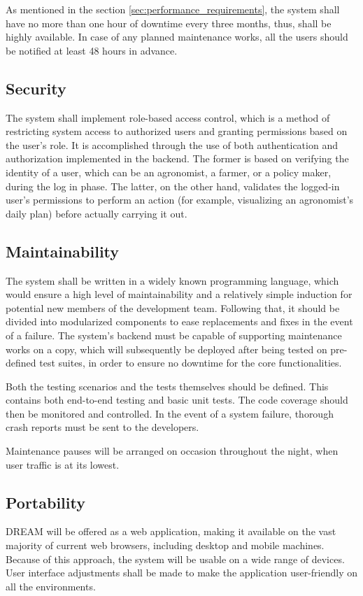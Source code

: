 As mentioned in the section \ref{sec:performance_requirements}, the system shall have no more than one hour of downtime every three months, thus, shall be highly available. In case of any planned maintenance works, all the users should be notified at least 48 hours in advance.

\subsection{Security}

The system shall implement role-based access control, which is a method of restricting system access to authorized users and granting permissions based on the user's role. It is accomplished through the use of both authentication and authorization implemented in the backend. The former is based on verifying the identity of a user, which can be an agronomist, a farmer, or a policy maker, during the log in phase. The latter, on the other hand, validates the logged-in user's permissions to perform an action (for example, visualizing an agronomist's daily plan) before actually carrying it out.

\subsection{Maintainability}

The system shall be written in a widely known programming language, which would ensure a high level of maintainability and a relatively simple induction for potential new members of the development team. Following that, it should be divided into modularized components to ease replacements and fixes in the event of a failure. The system's backend must be capable of supporting maintenance works on a copy, which will subsequently be deployed after being tested on pre-defined test suites, in order to ensure no downtime for the core functionalities.

Both the testing scenarios and the tests themselves should be defined. This contains both end-to-end testing and basic unit tests. The code coverage should then be monitored and controlled. In the event of a system failure, thorough crash reports must be sent to the developers.

Maintenance pauses will be arranged on occasion throughout the night, when user traffic is at its lowest.

\subsection{Portability}

DREAM will be offered as a web application, making it available on the vast majority of current web browsers, including desktop and mobile machines. Because of this approach, the system will be usable on a wide range of devices. User interface adjustments shall be made to make the application user-friendly on all the environments.
